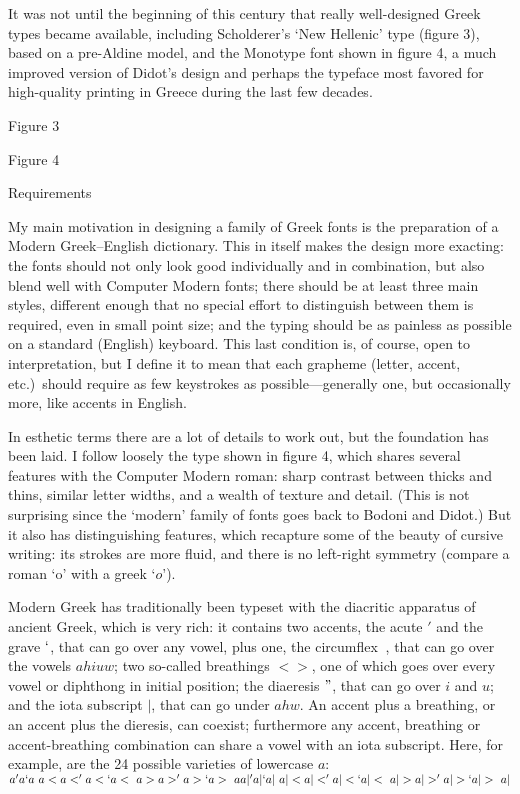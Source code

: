 It was not until the beginning of this century that really
well-designed Greek types became available, including Scholderer's
`New Hellenic' type (figure 3), based on a pre-Aldine model,
and the Monotype font shown in figure 4, a much improved version
of Didot's design and perhaps the typeface most favored for
high-quality printing in Greece during the last few decades.
\caption{\eightpoint Figure 3}

\caption{\eightpoint Figure 4}

\heading Requirements \endheading

My main motivation in designing a family of Greek fonts is the
preparation of a Modern Greek--English dictionary.  This in itself
makes the design more exacting: the fonts should not only look good
individually and in combination, but also blend well with Computer
Modern fonts; there should be at least three main styles, different
enough that no special effort to distinguish between them is required,
even in small point size; and the typing should be as painless as
possible on a standard (English) keyboard.
This last condition is, of course, open to interpretation, but I
define it to mean that each grapheme (letter, accent, etc.)~should
require as few keystrokes as possible---generally one, but
occasionally more, like accents in English.

In esthetic terms there are a lot of details to work out, but the
foundation has been laid.  I follow loosely the type shown in figure 4,
which shares several features with the Computer Modern roman:
sharp contrast between thicks and thins, similar letter widths,
and a wealth of texture and detail.  (This is not surprising since
the `modern' family of fonts goes back to Bodoni and Didot.)
But it also has distinguishing features, which recapture some of the
beauty of cursive writing: its strokes are more fluid, and there
is no left-right symmetry (compare a roman `o' with a greek `$o$').

Modern Greek has traditionally been typeset with the diacritic
apparatus of ancient Greek, which is very rich: it contains two accents,
the acute $'$ and the grave $`$, that can go over any vowel, plus one,
the circumflex $~$, that can go over the vowels $ahiuw$; two so-called
breathings $<>$, one of which goes over every vowel or diphthong
in initial position; the diaeresis $"$, that can go over $i$ and $u$;
and the iota subscript $|$, that can go under $ahw$.  An accent
plus a breathing, or an accent plus the dieresis, can coexist;
furthermore any accent, breathing or accent-breathing combination
can share a vowel with an iota subscript.  Here, for example,
are the 24 possible varieties of lowercase $a$:
\display
\hbox{$a 'a `a ~a <a <'a <`a <~a >a >'a >`a >~a
a| 'a| `a| ~a| <a| <'a| <`a| <~a| >a| >'a| >`a| >~a|$}
\display

